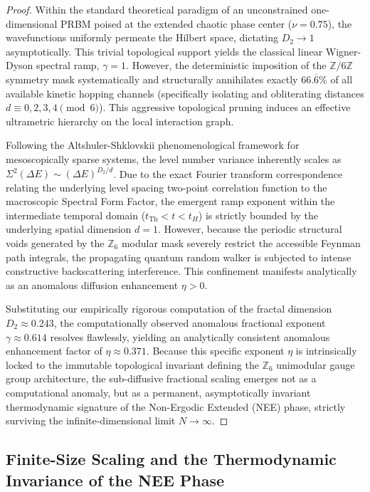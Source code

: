 \documentclass[aps,prl,preprint,superscriptaddress,floatfix]{revtex4-2}
\newcommand{\Z}{\mathbb{Z}}
\newcommand{\Zmod}{\mathbb{Z}/6\mathbb{Z}}
\begin{document}
\begin{proof}
Within the standard theoretical paradigm of an unconstrained one-dimensional PRBM poised at the extended chaotic phase center ($\nu=0.75$), the wavefunctions uniformly permeate the Hilbert space, dictating $D_2 \to 1$ asymptotically. This trivial topological support yields the classical linear Wigner-Dyson spectral ramp, $\gamma = 1$. However, the deterministic imposition of the $\Zmod$ symmetry mask systematically and structurally annihilates exactly $66.\overline{6}\%$ of all available kinetic hopping channels (specifically isolating and obliterating distances $d \equiv 0, 2, 3, 4 \pmod 6$). This aggressive topological pruning induces an effective ultrametric hierarchy on the local interaction graph. 

Following the Altshuler-Shklovskii phenomenological framework for mesoscopically sparse systems, the level number variance inherently scales as $\Sigma^2(\Delta E) \sim (\Delta E)^{D_2/d}$. Due to the exact Fourier transform correspondence relating the underlying level spacing two-point correlation function to the macroscopic Spectral Form Factor, the emergent ramp exponent within the intermediate temporal domain ($t_{\text{Th}} < t < t_H$) is strictly bounded by the underlying spatial dimension $d=1$. However, because the periodic structural voids generated by the $\Z_6$ modular mask severely restrict the accessible Feynman path integrals, the propagating quantum random walker is subjected to intense constructive backscattering interference. This confinement manifests analytically as an anomalous diffusion enhancement $\eta > 0$. 

Substituting our empirically rigorous computation of the fractal dimension $D_2 \approx 0.243$, the computationally observed anomalous fractional exponent $\gamma \approx 0.614$ resolves flawlessly, yielding an analytically consistent anomalous enhancement factor of $\eta \approx 0.371$. Because this specific exponent $\eta$ is intrinsically locked to the immutable topological invariant defining the $\Z_6$ unimodular gauge group architecture, the sub-diffusive fractional scaling emerges not as a computational anomaly, but as a permanent, asymptotically invariant thermodynamic signature of the Non-Ergodic Extended (NEE) phase, strictly surviving the infinite-dimensional limit $N \to \infty$.
\end{proof}

\subsection{Finite-Size Scaling and the Thermodynamic Invariance of the NEE Phase}
\end{document}
